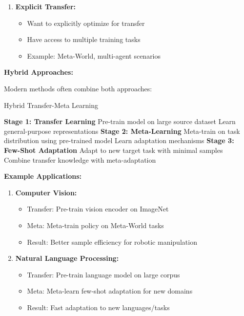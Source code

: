 \documentclass[12pt]{article}
\newcommand{\ieee}[1]{\textcolor{IEEEBlue}{\textbf{#1}}}
\begin{document}
{{\begin{enumerate}
				\item \textbf{Explicit Transfer:}
				\begin{itemize}
					\item Want to explicitly optimize for transfer
					\item Have access to multiple training tasks
					\item Example: Meta-World, multi-agent scenarios
				\end{itemize}
			\end{enumerate}
			
			\ieee{Hybrid Approaches:}
			
			Modern methods often combine both approaches:
			
			\begin{algorithm}[H]
			\caption{Hybrid Transfer-Meta Learning}
			\begin{algorithmic}[1]
			\STATE \textbf{Stage 1: Transfer Learning}
			\STATE Pre-train model on large source dataset
			\STATE Learn general-purpose representations
			\STATE \textbf{Stage 2: Meta-Learning}
			\STATE Meta-train on task distribution using pre-trained model
			\STATE Learn adaptation mechanisms
			\STATE \textbf{Stage 3: Few-Shot Adaptation}
			\STATE Adapt to new target task with minimal samples
			\STATE Combine transfer knowledge with meta-adaptation
			\end{algorithmic}
			\end{algorithm}
			
			\textbf{Example Applications:}
			
			\begin{enumerate}
				\item \textbf{Computer Vision:}
				\begin{itemize}
					\item Transfer: Pre-train vision encoder on ImageNet
					\item Meta: Meta-train policy on Meta-World tasks
					\item Result: Better sample efficiency for robotic manipulation
				\end{itemize}
				
				\item \textbf{Natural Language Processing:}
				\begin{itemize}
					\item Transfer: Pre-train language model on large corpus
					\item Meta: Meta-learn few-shot adaptation for new domains
					\item Result: Fast adaptation to new languages/tasks
				\end{itemize}
			\end{enumerate}
			
}}
\end{document}
